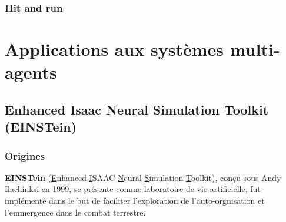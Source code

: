 \documentclass{article}
\begin{document}
\subsubsection{Hit and run}




\section{Applications aux systèmes multi-agents}

\subsection{Enhanced Isaac Neural Simulation Toolkit (EINSTein)}

\subsubsection{Origines}
\textbf{EINSTein} (\underline{E}nhanced \underline{I}SAAC \underline{N}eural \underline{S}imulation \underline{T}oolkit), conçu sous Andy Ilachinksi en 1999, se présente comme \og{}laboratoire\fg{} de vie artificielle, fut implémenté dans le but de faciliter l'exploration de l'auto-orgnisation et l'emmergence dans le combat terrestre. 
\end{document}
